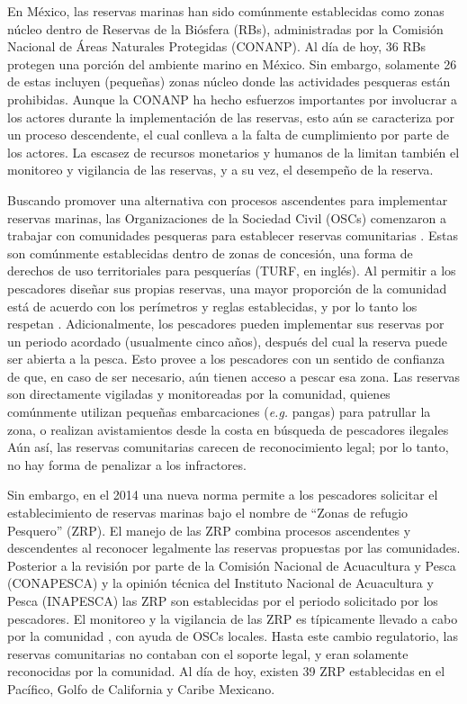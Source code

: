 \documentclass{frontiersSCNS}
\begin{document}
En México, las reservas marinas han sido comúnmente establecidas como
zonas núcleo dentro de Reservas de la Biósfera (RBs), administradas por
la Comisión Nacional de Áreas Naturales Protegidas (CONANP). Al día de
hoy, 36 RBs protegen una porción del ambiente marino en México. Sin
embargo, solamente 26 de estas incluyen (pequeñas) zonas núcleo donde
las actividades pesqueras están prohibidas. Aunque la CONANP ha hecho
esfuerzos importantes por involucrar a los actores durante la
implementación de las reservas, esto aún se caracteriza por un proceso
descendente, el cual conlleva a la falta de cumplimiento por parte de
los actores. La escasez de recursos monetarios y humanos de la limitan
también el monitoreo y vigilancia de las reservas, y a su vez, el
desempeño de la reserva.

Buscando promover una alternativa con procesos ascendentes para
implementar reservas marinas, las Organizaciones de la Sociedad Civil
(OSCs) comenzaron a trabajar con comunidades pesqueras para establecer
reservas comunitarias \citep{uribe_2010-u2} . Estas son comúnmente
establecidas dentro de zonas de concesión, una forma de derechos de uso
territoriales para pesquerías (TURF, en inglés). Al permitir a los
pescadores diseñar sus propias reservas, una mayor proporción de la
comunidad está de acuerdo con los perímetros y reglas establecidas, y
por lo tanto los respetan
\citep{gelcich_2015-Gw,espinosaromero_2014-PY,beger_2004-Y8} .
Adicionalmente, los pescadores pueden implementar sus reservas por un
periodo acordado (usualmente cinco años), después del cual la reserva
puede ser abierta a la pesca. Esto provee a los pescadores con un
sentido de confianza de que, en caso de ser necesario, aún tienen acceso
a pescar esa zona. Las reservas son directamente vigiladas y
monitoreadas por la comunidad, quienes comúnmente utilizan pequeñas
embarcaciones (\emph{e.g.} pangas) para patrullar la zona, o realizan
avistamientos desde la costa en búsqueda de pescadores ilegales Aún así,
las reservas comunitarias carecen de reconocimiento legal; por lo tanto,
no hay forma de penalizar a los infractores.

Sin embargo, en el 2014 una nueva norma \citep{nom} permite a los
pescadores solicitar el establecimiento de reservas marinas bajo el
nombre de ``Zonas de refugio Pesquero'' (ZRP). El manejo de las ZRP
combina procesos ascendentes y descendentes al reconocer legalmente las
reservas propuestas por las comunidades. Posterior a la revisión por
parte de la Comisión Nacional de Acuacultura y Pesca (CONAPESCA) y la
opinión técnica del Instituto Nacional de Acuacultura y Pesca (INAPESCA)
las ZRP son establecidas por el periodo solicitado por los pescadores.
El monitoreo y la vigilancia de las ZRP es típicamente llevado a cabo
por la comunidad , con ayuda de OSCs locales. Hasta este cambio
regulatorio, las reservas comunitarias no contaban con el soporte legal,
y eran solamente reconocidas por la comunidad. Al día de hoy, existen 39
ZRP establecidas en el Pacífico, Golfo de California y Caribe Mexicano.
\end{document}
